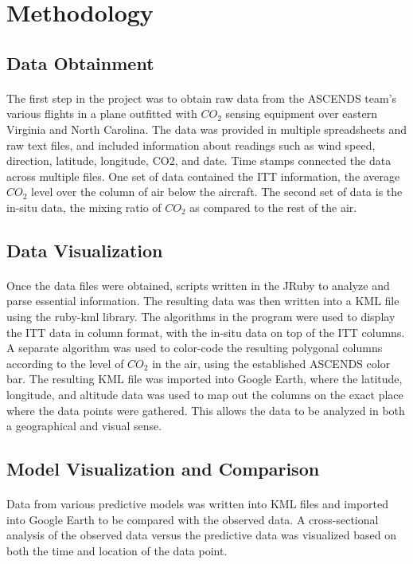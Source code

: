 \documentclass[12pt,letterpaper]{report}
\begin{document}
 \section*{Methodology}
  \subsection*{Data Obtainment}
   \paragraph{}
    The first step in the project was to obtain raw data from the ASCENDS team's various flights in a plane outfitted with $CO_2$ sensing equipment over eastern Virginia and North Carolina.  The data was provided in multiple spreadsheets and raw text files, and included information about readings such as wind speed, direction, latitude, longitude, CO2, and date. Time stamps connected the data across multiple files. One set of data contained the ITT information, the average $CO_2$ level over the column of air below the aircraft. The second set of data is the in-situ data, the mixing ratio of $CO_2$ as compared to the rest of the air.
  \subsection*{Data Visualization}
   \paragraph{}
    Once the data files were obtained, scripts written in the JRuby to analyze and parse essential information. The resulting data was then written into a KML file using the ruby-kml library. The algorithms in the program were used to display the ITT data in column format, with the in-situ data on top of the ITT columns. A separate algorithm was used to color-code the resulting polygonal columns according to the level of $CO_2$ in the air, using the established ASCENDS color bar. The resulting KML file was imported into Google Earth, where the latitude, longitude, and altitude data was used to map out the columns on the exact place where the data points were gathered. This allows the data to be analyzed in both a geographical and visual sense.
  \subsection*{Model Visualization and Comparison}
   \paragraph{}
    Data from various predictive models was written into KML files and imported into Google Earth to be compared with the observed data. A cross-sectional analysis of the observed data versus the predictive data was visualized based on both the time and location of the data point.
\end{document}

